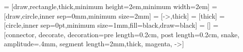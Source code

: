 
 = [draw,rectangle,thick,minimum height=2em,minimum width=2em]
 = [draw,circle,inner sep=0mm,minimum size=2mm]
 = [->,thick]
 = [thick]
 = [circle,inner sep=0pt,minimum size=1mm,fill=black,draw=black]
 = []
 = [connector, decorate, decoration={pre length=0.2cm,
                         post length=0.2cm, snake, amplitude=.4mm,
                         segment length=2mm},thick, magenta, ->]

\renewcommand{\vec}[1]{\ensuremath{\boldsymbol{#1}}} %
\def \myneq {\skew{-2}\not =} %
